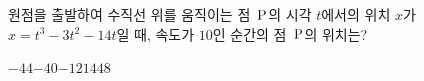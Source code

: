 원점을 출발하여 수직선 위를 움직이는 점~$\mathrm{P}$의 시각 $t$에서의 위치 $x$가 $x=t^3-3t^2-14t$일 때, 속도가 $10$인 순간의 점~$\mathrm{P}$의 위치는?
\begin{choices32}{$-44$}{$-40$}{$-12$}{$14$}{$48$}\end{choices32}
